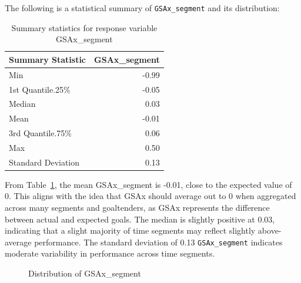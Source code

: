 \documentclass[
  letterpaper,
  DIV=11,
  numbers=noendperiod]{scrartcl}
\begin{document}
The following is a statistical summary of \texttt{GSAx\_segment} and its
distribution:

\begin{longtable}[]{@{}lr@{}}

\caption{\label{tbl-1}Summary statistics for response variable
GSAx\_segment}

\tabularnewline

\toprule\noalign{}
Summary Statistic & GSAx\_segment \\
\midrule\noalign{}
\endhead
\bottomrule\noalign{}
\endlastfoot
Min & -0.99 \\
1st Quantile.25\% & -0.05 \\
Median & 0.03 \\
Mean & -0.01 \\
3rd Quantile.75\% & 0.06 \\
Max & 0.50 \\
Standard Deviation & 0.13 \\

\end{longtable}

From Table~\ref{tbl-1}, the mean GSAx\_segment is -0.01, close to the
expected value of 0. This aligns with the idea that GSAx should average
out to 0 when aggregated across many segments and goaltenders, as GSAx
represents the difference between actual and expected goals. The median
is slightly positive at 0.03, indicating that a slight majority of time
segments may reflect slightly above-average performance. The standard
deviation of 0.13 \texttt{GSAx\_segment} indicates moderate variability
in performance across time segments.

\begin{figure}


\caption{\label{fig-1}Distribution of GSAx\_segment}

\end{figure}%
\end{document}

